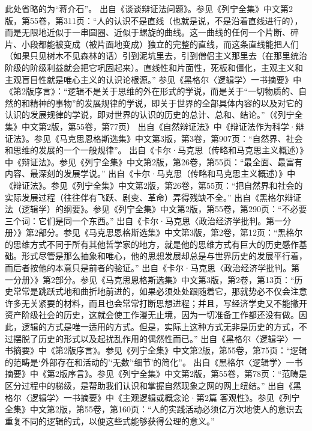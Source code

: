 \begin{maonote}
此处省略的为“蒋介石”。
出自《谈谈辩证法问题》。参见《列宁全集》中文第2版，第55卷，第311页：“人的认识不是直线（也就是说，不是沿着直线进行的），而是无限地近似于一串圆圈、近似于螺旋的曲线。这一曲线的任何一个片断、碎片、小段都能被变成（被片面地变成）独立的完整的直线，而这条直线能把人们（如果只见树木不见森林的话）引到泥坑里去，引到僧侣主义那里去（在那里统治阶级的阶级利益就会把它巩固起来）。直线性和片面性，死板和僵化，主观主义和主观盲目性就是唯心主义的认识论根源。”
参见《黑格尔〈逻辑学〉一书摘要》中《第2版序言》：“逻辑不是关于思维的外在形式的学说，而是关于“一切物质的、自然的和精神的事物”的发展规律的学说，即关于世界的全部具体内容的以及对它的认识的发展规律的学说，即对世界的认识的历史的总计、总和、结论。”（《列宁全集》中文第2版，第55卷，第77页）
出自《自然辩证法》中《辩证法作为科学·辩证法》。参见《马克思恩格斯选集》中文第3版，第3卷，第907页：“自然界、社会和思维的发展的一个一般规律”。
出自《卡尔·马克思（传略和马克思主义概述）》中《辩证法》。参见《列宁全集》中文第2版，第26卷，第55页：“最全面、最富有内容、最深刻的发展学说。”
出自《卡尔·马克思（传略和马克思主义概述）》中《辩证法》。参见《列宁全集》中文第2版，第26卷，第55页：“把自然界和社会的实际发展过程（往往伴有飞跃、剧变、革命）弄得残缺不全。”
出自《黑格尔辩证法（逻辑学）的纲要》。参见《列宁全集》中文第2版，第55卷，第290页：“不必要三个词：它们是同一个东西。”
出自《卡尔·马克思〈政治经济学批判。第一分册〉》第2部分。参见《马克思恩格斯选集》中文第3版，第2卷，第12页：“黑格尔的思维方式不同于所有其他哲学家的地方，就是他的思维方式有巨大的历史感作基础。形式尽管是那么抽象和唯心，他的思想发展却总是与世界历史的发展平行着，而后者按他的本意只是前者的验证。”
出自《卡尔·马克思〈政治经济学批判。第一分册〉》第2部分。参见《马克思恩格斯选集》中文第3版，第2卷，第13页：“历史常常是跳跃式地和曲折地前进的，如果必须处处跟随着它，那就势必不仅会注意许多无关紧要的材料，而且也会常常打断思想进程；并且，写经济学史又不能撇开资产阶级社会的历史，这就会使工作漫无止境，因为一切准备工作都还没有做。因此，逻辑的方式是唯一适用的方式。但是，实际上这种方式无非是历史的方式，不过摆脱了历史的形式以及起扰乱作用的偶然性而已。”
出自《黑格尔〈逻辑学〉一书摘要》中《第2版序言》。参见《列宁全集》中文第2版，第55卷，第75页：“逻辑的范畴是‘外部存在和活动的’‘无数’‘细节’的简化”。
出自《黑格尔〈逻辑学〉一书摘要》中《第2版序言》。参见《列宁全集》中文第2版，第55卷，第78页：“范畴是区分过程中的梯级，是帮助我们认识和掌握自然现象之网的网上纽结。”
出自《黑格尔〈逻辑学〉一书摘要》中《主观逻辑或概念论·第2篇 客观性》。参见《列宁全集》中文第2版，第55卷，第160页：“人的实践活动必须亿万次地使人的意识去重复不同的逻辑的式，以便这些式能够获得公理的意义。”

\end{maonote}
